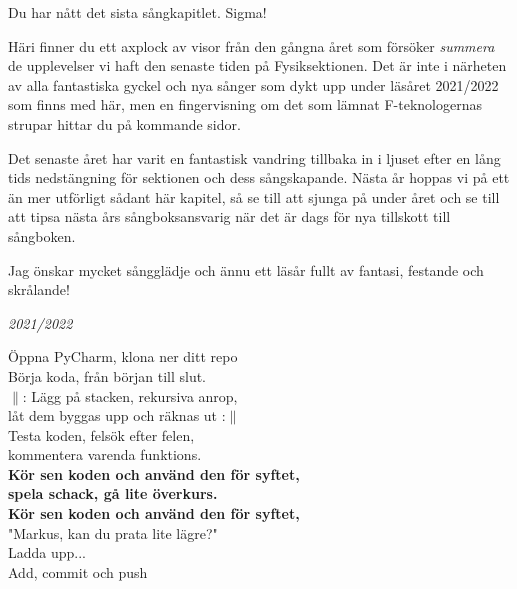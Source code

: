\documentclass[a6paper, 10pt, twoside]{article}
\begin{document}
\noindent
{}
\small
\vspace{10pt}

\noindent
\small
Du har nått det sista sångkapitlet. Sigma! 

Häri finner du ett axplock av visor från den gångna året som försöker \textit{summera} de upplevelser vi haft den senaste tiden på Fysiksektionen. Det är inte i närheten av alla fantastiska gyckel och nya sånger som dykt upp under läsåret 2021/2022 som finns med här, men en fingervisning om det som lämnat F-teknologernas strupar hittar du på kommande sidor. 

Det senaste året har varit en fantastisk vandring tillbaka in i ljuset efter en lång tids nedstängning för sektionen och dess sångskapande. Nästa år hoppas vi på ett än mer utförligt sådant här kapitel, så se till att sjunga på under året och se till att tipsa nästa års sångboksansvarig när det är dags för nya tillskott till sångboken.

Jag önskar mycket sångglädje och ännu ett läsår fullt av fantasi, festande och skrålande!

\begin{center}
\huge{\textit{2021/2022}}
\end{center}

\begin{center}
\end{center}
\begin{lyrics}
Öppna PyCharm, klona ner ditt repo \\
Börja koda, från början till slut. \\
$\|$: Lägg på stacken, rekursiva anrop, \\
låt dem byggas upp och räknas ut :$\|$
\vspace{5pt}\\
Testa koden, felsök efter felen, \\
kommentera varenda funktions. \\
\textbf{Kör sen koden och använd den för syftet, \\
spela schack, gå lite överkurs. \\
Kör sen koden och använd den för syftet, }
\vspace{5pt}\\
"Markus, kan du prata lite lägre?"
\vspace{5pt}\\
Ladda upp...\\
Add, commit och push\\
\end{lyrics}
\end{document}
